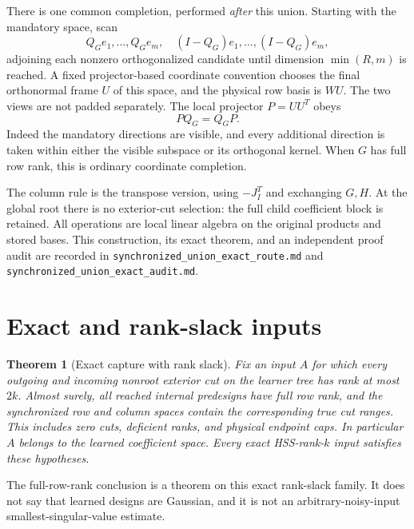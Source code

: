 \documentclass[11pt,oneside,openany,a4paper]{report}
\numberwithin{equation}{chapter}
\newtheorem{theorem}{Theorem}[chapter]
\theoremstyle{definition}
\theoremstyle{remark}
\newcommand{\sourcefile}[1]{{\small\nolinkurl{#1}}}
\begin{document}
There is one common completion, performed \emph{after} this union.
Starting with the mandatory space, scan
\[
 Q_Ge_1,\ldots,Q_Ge_m,
 \quad (I-Q_G)e_1,\ldots,(I-Q_G)e_m,
\]
adjoining each nonzero orthogonalized candidate until dimension
$\min(R,m)$ is reached.  A fixed projector-based coordinate convention
chooses the final orthonormal frame $U$ of this space, and the physical
row basis is $WU$.  The two views are not padded separately.
The local projector $P=UU^T$ obeys
\begin{equation}
 PQ_G=Q_GP.
 \label{eq:route-commuting-completion}
\end{equation}
Indeed the mandatory directions are visible, and every additional
direction is taken within either the visible subspace or its orthogonal
kernel.  When $G$ has full row rank, this is ordinary coordinate
completion.

The column rule is the transpose version, using $-J_I^T$ and exchanging
$G,H$.  At the global root there is no exterior-cut selection: the full
child coefficient block is retained.  All operations are local linear
algebra on the original products and stored bases.  This construction,
its exact theorem, and an independent proof audit are recorded in
\sourcefile{synchronized_union_exact_route.md} and
\sourcefile{synchronized_union_exact_audit.md}.

\section{Exact and rank-slack inputs}

\begin{theorem}[Exact capture with rank slack]
\label{thm:route-exact}
Fix an input $A$ for which every outgoing and incoming nonroot exterior
cut on the learner tree has rank at most $2k$.  Almost surely, all reached
internal predesigns have full row rank, and the synchronized row and
column spaces contain the corresponding true cut ranges.  This includes
zero cuts, deficient ranks, and physical endpoint caps.  In particular
$A$ belongs to the learned coefficient space.  Every exact HSS-rank-$k$
input satisfies these hypotheses.
\end{theorem}

The full-row-rank conclusion is a theorem on this exact rank-slack
family.  It does not say that learned designs are Gaussian, and it is
not an arbitrary-noisy-input smallest-singular-value estimate.
\end{document}
